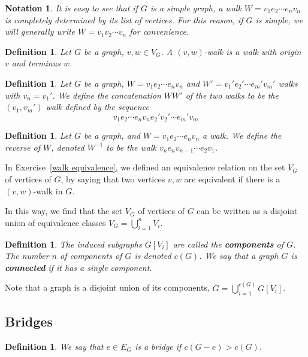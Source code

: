 \documentclass[12pt]{report}
\theoremstyle{plain}
\newtheorem{defn}[thm]{Definition}
\newtheorem{notn}[thm]{Notation}
\newcommand{\Xb}[1]{\textbf{#1}\index{#1}}
\begin{document}
\begin{notn}
It is easy to see that if $G$ is a simple graph, a walk $W = v_1 e_2 \cdots
e_n v_n$ is completely determined by its list of vertices. For this reason,
if $G$ is simple, we will generally write $W = v_1 v_2 \cdots v_n$ for
convenience.
\end{notn}

\begin{defn}
Let $G$ be a graph, $v, w \in V_G$. A $(v, w)$-walk is a walk with origin
$v$ and terminus $w$.
\end{defn}

\begin{defn}
Let $G$ be a graph, $W = v_1 e_2 \cdots e_n v_n$ and $W' = v_1' e_2' \cdots
e_m' v_m'$ walks with $v_n = v_1'$. We define the concatenation $WW'$ of
the two walks to be the $(v_1,v_m')$ walk defined by the sequence
\[v_1 e_2 \cdots e_n v_n e_2' v_2' \cdots e_m' v_m \]
\end{defn}

\begin{defn}
Let $G$ be a graph, and $W = v_1 e_2 \cdots e_n v_n$ a walk. We define the
reverse of $W$, denoted $W^{-1}$ to be the walk $v_n e_n v_{n-1} \cdots e_2
v_1$.
\end{defn}

In Exercise~\ref{walk equivalence}, we defined an equivalence relation on
the set $V_G$ of vertices of $G$, by saying that two vertices $v, w$ are
equivalent if there is a $(v,w)$-walk in $G$.

In this way, we find that the set $V_G$ of vertices of $G$ can be written
as a disjoint union of equivalence classes $V_G = \bigcup_{i = 1}^n V_i$.

\begin{defn}
The induced subgraphs $G[V_i]$ are called the \Xb{components} of $G$. The
number $n$ of components of $G$ is denoted $c(G)$. We say that a graph $G$
is \Xb{connected} if it has a single component.
\end{defn}

Note that a graph is a disjoint union of its components, $G = \bigcup_{i =
1}^{c(G)} G[V_i]$.

\subsection{Bridges}

\begin{defn}
We say that $e \in E_G$ is a bridge if $c(G - e) > c(G)$.
\end{defn}
\end{document}
